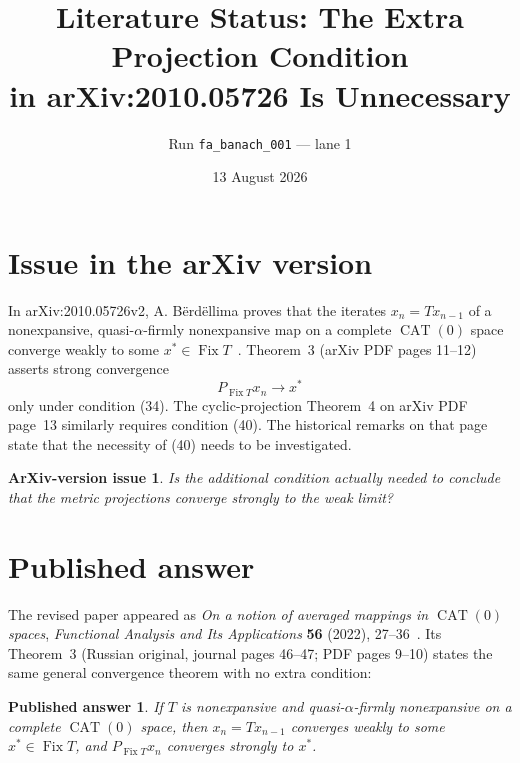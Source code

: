 \documentclass[11pt]{article}
\title{Literature Status: The Extra Projection Condition\\
in arXiv:2010.05726 Is Unnecessary}
\author{Run \texttt{fa\_banach\_001} --- lane 1}
\date{13 August 2026}
\newtheorem*{question}{ArXiv-version issue}
\newtheorem*{answer}{Published answer}
\begin{document}
\maketitle

\begin{center}
\end{center}

\section{Issue in the arXiv version}

In arXiv:2010.05726v2, A. B\"erd\"ellima proves that the iterates
$x_n=T x_{n-1}$ of a nonexpansive, quasi-$\alpha$-firmly nonexpansive
map on a complete $\operatorname{CAT}(0)$ space converge weakly to some
$x^*\in\operatorname{Fix}T$~\cite{arxiv}.  Theorem~3 (arXiv PDF pages
11--12) asserts strong convergence
\[
 P_{\operatorname{Fix}T}x_n\longrightarrow x^*
\]
only under condition (34).  The cyclic-projection Theorem~4 on arXiv
PDF page~13 similarly requires condition (40).  The historical remarks
on that page state that the necessity of (40) needs to be investigated.

\begin{question}
Is the additional condition actually needed to conclude that the
metric projections converge strongly to the weak limit?
\end{question}

\section{Published answer}

The revised paper appeared as \emph{On a notion of averaged mappings in
$\operatorname{CAT}(0)$ spaces}, \emph{Functional Analysis and Its
Applications} \textbf{56} (2022), 27--36~\cite{published}.  Its
Theorem~3 (Russian original, journal pages 46--47; PDF pages 9--10)
states the same general convergence theorem with no extra condition:

\begin{answer}
If $T$ is nonexpansive and quasi-$\alpha$-firmly nonexpansive on a
complete $\operatorname{CAT}(0)$ space, then $x_n=T x_{n-1}$ converges
weakly to some $x^*\in\operatorname{Fix}T$, and
$P_{\operatorname{Fix}T}x_n$ converges strongly to $x^*$.
\end{answer}
\end{document}
